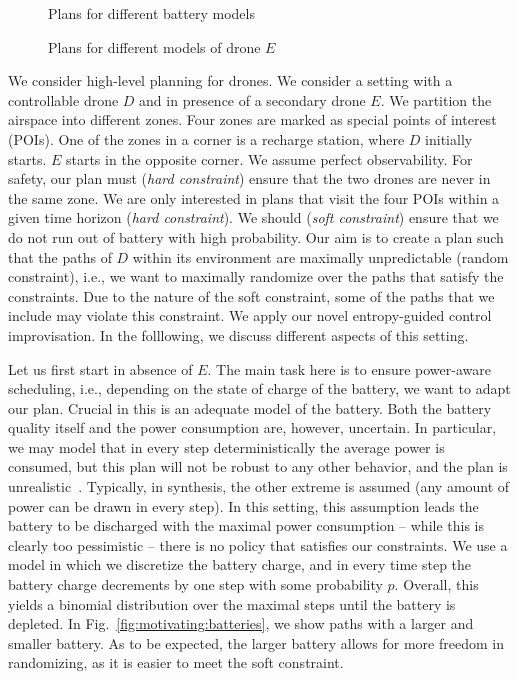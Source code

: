 
\begin{figure}
  \centering
\caption{Plans for different battery models}	
\end{figure}

\begin{figure*}

\caption{Plans for different models of drone $E$}	
\end{figure*}


We consider high-level planning for drones. We consider a setting with a controllable drone $D$ and in presence of a secondary drone $E$. 
We partition the airspace into different zones. Four zones are marked as special points of interest (POIs).
One of the zones in a corner is a recharge station, where $D$ initially starts. $E$ starts in the opposite corner. We assume perfect observability.  
For safety, our plan must (\emph{hard constraint}) ensure that the two drones are never in the same zone. We are only interested in plans that visit the four POIs within a given time horizon (\emph{hard constraint}).
We should (\emph{soft constraint}) ensure that we do not run out of battery with high probability. 
Our aim is to create a plan such that the paths of $D$ within its environment are maximally unpredictable (random constraint), i.e., we want to maximally randomize over the paths that satisfy the constraints. Due to the nature of the soft constraint, some of the paths that we include may violate this constraint.  We apply our novel entropy-guided control improvisation. In the folllowing, we discuss different aspects of this setting.

Let us first start in absence of $E$. 
The main task here is to ensure power-aware scheduling, i.e., depending on the state of charge of the battery, we want to adapt our plan. Crucial in this is an adequate model of the battery. 
Both the battery quality itself and the power consumption are, however, uncertain. 
In particular, we may model that in every step deterministically the average power is consumed, but this plan will not be robust to any other behavior, and the plan is unrealistic~\cite{DBLP:conf/cyphy/HermannsKN15}. Typically, in synthesis, the other extreme is assumed (any amount of power can be drawn in every step). In this setting, this assumption leads the battery to be discharged with the maximal power consumption -- while this is clearly too pessimistic -- there is no policy that satisfies our constraints.
We use a model in which we discretize the battery charge, and in every time step the battery charge decrements by one step with some probability $p$. 
Overall, this yields a binomial distribution over the maximal steps until the battery is depleted.
In Fig.~\ref{fig:motivating:batteries}, we show paths with a larger and smaller battery. As to be expected, the larger battery allows for more freedom in randomizing, as it is easier to meet the soft constraint.


